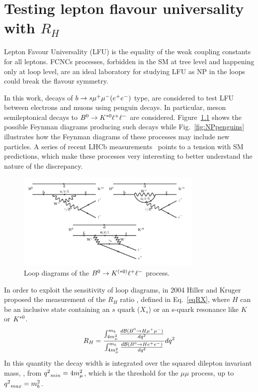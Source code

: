 \chapter{Testing lepton flavour universality with $R_H$}
\label{sec:RKst_theory}

Lepton Favour Universality (LFU) is the equality of the weak coupling constants for all leptons.
FCNCs processes, forbidden in the SM at tree level and happening
only at loop level, are an ideal laboratory for studying LFU as NP in the loops could break the flavour symmetry.
 
In this work, decays of $b \rightarrow s{\mu^+\mu^-} (e^+ e^-)$ type, are considered to test LFU
between electrons and muons using penguin decays.
In particular, \Bz meson semileptonical decays to ${{B}^0}\rightarrow{\ensuremath{{K}^{*0}}}\ell^+ \ell^-$ are considered.
Figure~\ref{fig:RKpenguins} shows the possible Feynman diagrams 
producing such decays while Fig.~\ref{fig:NPpenguins} illustrates how the Feynman 
diagrams of these processes may include new particles. 
A series of recent LHCb measurements~\cite{TomRDreview}
points to a tension with SM predictions, which make these processes very interesting
to better understand the nature of the discrepancy.
%
\begin{figure}[h]
\centering \includegraphics[width=0.8\textwidth]{RKst/figs/penguins3.png}
\caption{Loop diagrams of the ${{B}^0} \rightarrow K^{(*0)}\ell^+ \ell^-$ process.}
\label{fig:RKpenguins}
\end{figure}

In order to exploit the sensitivity of loop diagrams, in 2004 Hiller and Kruger proposed the measurement 
of the $R_H$ ratio \cite{Hiller:2003js}, defined in Eq.~\ref{eqRX}, where $H$ can be an inclusive state containing 
an $s$ quark ($X_s$) or an s-quark resonance like $K$ or ${{K}^{*0}}$.
\begin{equation}
\label{eqRX}
R_{H} = \frac{\int_{4m_{\mu}^2}^{m_b} \frac{ d{\cal B}({{B}^0} \rightarrow H {\mu^+\mu^-}) }{d{q^2}}}{ \int_{4m_{\mu}^2}^{m_b}\frac{ d{\cal B}({{B}^0} \rightarrow H{e^+e^-}) }{d{q^2}}} d{q^2}
\end{equation}
In this quantity the decay width is integrated over the squared dilepton invariant mass, \qsq, from 
${q^2}_{min} = 4m_{\mu}^2$, which is the threshold for the $\mu\mu$ process, up to \mbox{${q^2}_{max} = m_b^2$.} 

